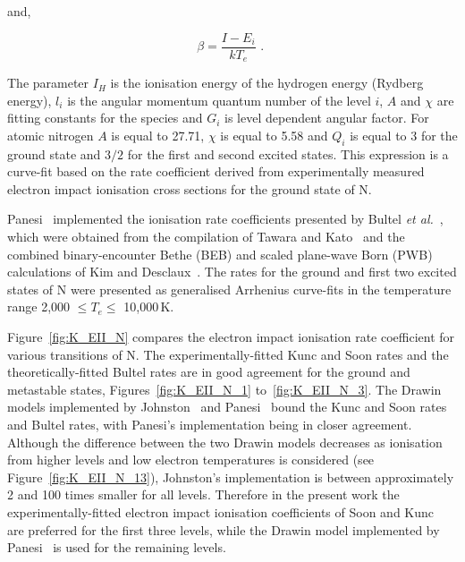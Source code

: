 {\noindent and, 

\begin{equation}
 \beta = \frac{I - E_i}{kT_e} \text{ . } \label{eq:K_EII_Soon_Kunc_c}
\end{equation}

\noindent The parameter $I_H$ is the ionisation energy of the hydrogen energy (Rydberg energy), $l_i$ is the angular momentum quantum number of the level $i$, $A$ and $\chi$ are fitting constants for the species and $G_i$ is level dependent angular factor.
For atomic nitrogen $A$ is equal to 27.71, $\chi$ is equal to 5.58 and $Q_i$ is equal to 3 for the ground state and $3/2$ for the first and second excited states.
This expression is a curve-fit based on the rate coefficient derived from experimentally measured electron impact ionisation cross sections for the ground state of N.

\par

Panesi~\cite{panesi_phd} implemented the ionisation rate coefficients presented by Bultel \textit{et al.}~\cite{BBB+2006}, which were obtained from the compilation of Tawara and Kato~\cite{TK1999} and the combined binary-encounter Bethe (BEB) and scaled plane-wave Born (PWB) calculations of Kim and Desclaux~\cite{KD2002}.
The rates for the ground and first two excited states of N were presented as generalised Arrhenius curve-fits in the temperature range 2,000 $\leq T_e \leq$ 10,000\,K.

\par

Figure~\ref{fig:K_EII_N} compares the electron impact ionisation rate coefficient for various transitions of N.
The experimentally-fitted Kunc and Soon rates and the theoretically-fitted Bultel rates are in good agreement for the ground and metastable states, Figures~\ref{fig:K_EII_N_1} to~\ref{fig:K_EII_N_3}.
The Drawin models implemented by Johnston~\cite{JohnPhd} and Panesi~\cite{panesi_phd} bound the Kunc and Soon rates and Bultel rates, with Panesi's implementation being in closer agreement.
Although the difference between the two Drawin models decreases as ionisation from higher levels and low electron temperatures is considered (see Figure~\ref{fig:K_EII_N_13}), Johnston's implementation is between approximately 2 and 100 times smaller for all levels.
Therefore in the present work the experimentally-fitted electron impact ionisation coefficients of Soon and Kunc~\cite{SK1990} are preferred for the first three levels, while the Drawin model implemented by Panesi~\cite{JohnPhd} is used for the remaining levels.

}
